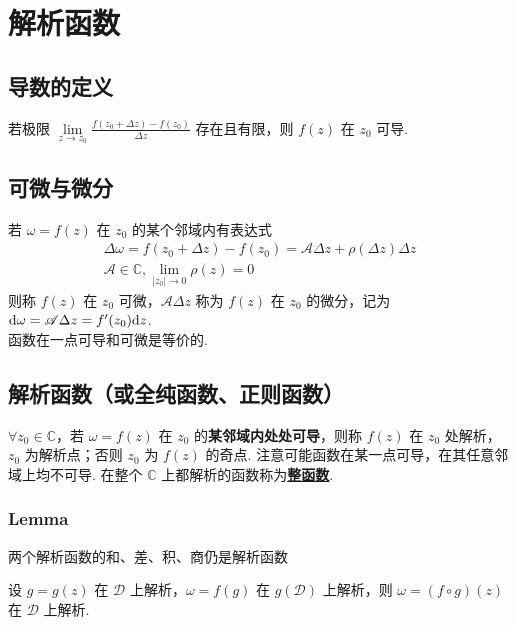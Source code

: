 \documentclass[./main.tex]{subfiles}
\begin{document}
\section{解析函数}
\subsection{导数的定义}
若极限 $\lim\limits_{z\rightarrow z_0}\frac{f(z_0+\Delta z)-f(z_0)}{\Delta z}$ 存在且有限，则 $f(z)$ 在 $z_0$ 可导. 
\subsection{可微与微分}
若 $\omega=f(z)$ 在 $z_0$ 的某个邻域内有表达式
\begin{gather}
    \Delta\omega=f(z_0+\Delta z)-f(z_0)=\mathscr{A}\Delta z+\rho(\Delta z)\Delta z\\
    \mathscr{A}\in\mathbb{C},\lim\limits_{|z_0|\rightarrow 0}\rho(z)=0
\end{gather}
则称 $f(z)$ 在 $z_0$ 可微，$\mathscr{A}\Delta z$ 称为 $f(z)$ 在 $z_0$ 的微分，记为 $\text{d}\omega=\mathscr{A}\Delta z=f'(z_0)\text{d}z$. \\
\indent 函数在一点可导和可微是等价的. 
\subsection{解析函数（或全纯函数、正则函数）}
$\forall z_0\in\mathbb{C}$，若 $\omega=f(z)$ 在 $z_0$ 的\textbf{某邻域内处处可导}，则称 $f(z)$ 在 $z_0$ 处解析，$z_0$ 为解析点；否则 $z_0$ 为 $f(z)$ 的奇点. 注意可能函数在某一点可导，在其任意邻域上均不可导. 在整个 $\mathbb{C}$ 上都解析的函数称为\underline{\textbf{整函数}}. 
\subsubsection{Lemma}
\begin{enumerate*}
    \item 两个解析函数的和、差、积、商仍是解析函数
    \item 设 $g=g(z)$ 在 $\mathscr{D}$ 上解析，$\omega=f(g)$ 在 $g(\mathscr{D})$ 上解析，则 $\omega=(f\circ g)(z)$ 在 $\mathscr{D}$ 上解析. 
\end{enumerate*}
\end{document}
